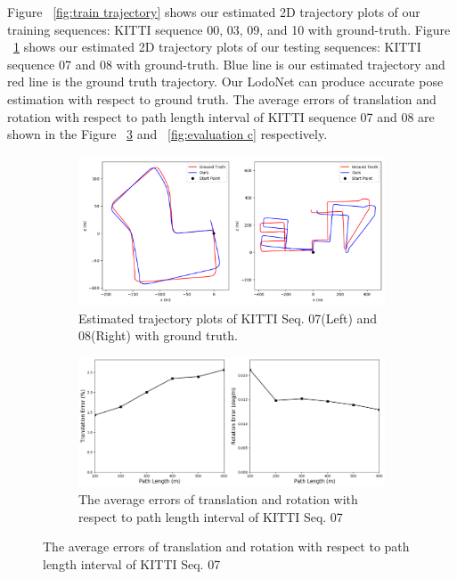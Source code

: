 \documentclass[sigconf]{acmart}
\def\lodo{LodoNet}
\begin{document}
 Figure ~\ref{fig:train trajectory} shows our estimated 2D trajectory plots of our training sequences: KITTI sequence 00, 03, 09, and 10 with ground-truth. Figure ~\ref{fig:evaluation a} shows our estimated 2D trajectory plots of our testing sequences: KITTI sequence 07 and 08 with ground-truth. Blue line is our estimated trajectory and red line is the ground truth trajectory.  Our \lodo{} can produce accurate pose estimation with respect to ground truth. The average errors of translation and rotation with respect to path length interval of KITTI sequence 07 and 08 are shown in the Figure ~\ref{fig:evaluation b} and  ~\ref{fig:evaluation c} respectively. 



\begin{figure}[h]
\setlength{\belowcaptionskip}{-0.2cm} 
     \centering
     \begin{subfigure}[b]{0.4\textwidth}
         \centering
         \includegraphics[width=\textwidth]{Figures/trajectory.png}
         \caption{Estimated trajectory plots of KITTI Seq. 07(Left) and 08(Right) with ground truth.}
         \label{fig:evaluation a}
     \end{subfigure}

     \begin{subfigure}[b]{0.4\textwidth}
         \centering
         \includegraphics[width=\textwidth]{Figures/error7.png}
         \caption{The average errors of translation and rotation with respect to path length interval of KITTI Seq. 07}
         \label{fig:evaluation b}
     \end{subfigure}
     

\end{figure}
\end{document}
